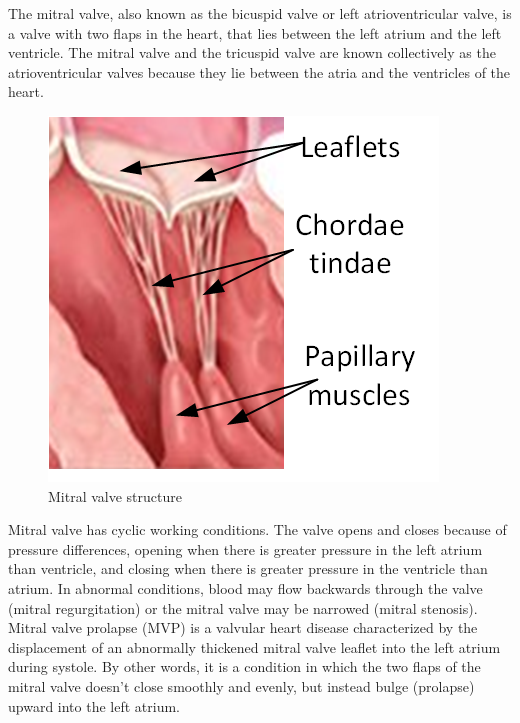 The mitral valve, also known as the bicuspid valve or left atrioventricular
valve, is a valve with two flaps in the heart, that lies between the left atrium
and the left ventricle. The mitral valve and the tricuspid valve are known
collectively as the atrioventricular valves because they lie between the atria
and the ventricles of the heart.
\begin{figure}[H]
  \centering
  \includegraphics[width=0.4\columnwidth]{./fig/mt.png}
  \caption{Mitral valve structure}
  \label{fig:MT}
\end{figure}
Mitral valve has cyclic working conditions. The valve opens and closes because
of pressure differences, opening when there is greater pressure in the left
atrium than ventricle, and closing when there is greater pressure in the
ventricle than atrium. In abnormal conditions, blood may flow backwards through
the valve (mitral regurgitation) or the mitral valve may be narrowed (mitral
stenosis). Mitral valve prolapse (MVP) is a valvular heart disease characterized
by the displacement of an abnormally thickened mitral valve leaflet into the
left atrium during systole. By other words, it is a condition in which the two
flaps of the mitral valve doesn't close smoothly and evenly, but instead bulge
(prolapse) upward into the left atrium.\cite{Hayek2005a}
